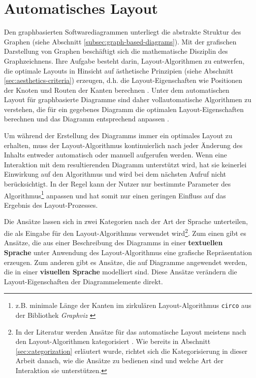\section{Automatisches Layout}
\label{sec:automatic-layout}

Den graphbasierten Softwarediagrammen unterliegt die abstrakte Struktur des Graphen (siehe Abschnitt \ref{subsec:graph-based-diagrams}). Mit der grafischen Darstellung von Graphen beschäftigt sich die mathematische Disziplin des Graphzeichnens. Ihre Aufgabe besteht darin, Layout-Algorithmen zu entwerfen, die optimale Layouts in Hinsicht auf ästhetische Prinzipien (siehe Abschnitt \ref{sec:aesthetics-criteria}) erzeugen, d.h. die Layout-Eigenschaften wie Positionen der Knoten und Routen der Kanten berechnen \cite{Eichelberger05Aesthetics, Arvo02Techniques, Siebenhaller03Automatisches, Maier12A-Pattern-based}. Unter dem automatischen Layout für graphbasierte Diagramme sind daher vollautomatische Algorithmen zu verstehen, die für ein gegebenes Diagramm die optimalen Layout-Eigenschaften berechnen und das Diagramm entsprechend anpassen \cite{Fuhrmann11On-the-Pragmatics}.

Um während der Erstellung des Diagramms immer ein optimales Layout zu erhalten, muss der Layout-Algorithmus kontinuierlich nach jeder Änderung des Inhalts entweder automatisch oder manuell aufgerufen werden. Wenn eine Interaktion mit dem resultierenden Diagramm unterstützt wird, hat sie keinerlei Einwirkung auf den Algorithmus und wird bei dem nächsten Aufruf nicht berücksichtigt. In der Regel kann der Nutzer nur bestimmte Parameter des Algorithmus\footnote{z.B. minimale Länge der Kanten im zirkulären Layout-Algorithmus \texttt{circo} aus der Bibliothek \textit{Graphviz} \cite{NorthGansner14Dot-Manual}} anpassen und hat somit nur einen geringen Einfluss auf das Ergebnis des Layout-Prozesses.

Die Ansätze lassen sich in zwei Kategorien nach der Art der Sprache unterteilen, die als Eingabe für den Layout-Algorithmus verwendet wird\footnote{In der Literatur werden Ansätze für das automatische Layout meistens nach den Layout-Algorithmen kategorisiert \cite{Fuhrmann11On-the-Pragmatics, Eichelberger05Aesthetics}. Wie bereits in Abschnitt \ref{sec:categorization} erläutert wurde, richtet sich die Kategorisierung in dieser Arbeit danach, wie die Ansätze zu bedienen sind und welche Art der Interaktion sie unterstützen.}. Zum einen gibt es Ansätze, die aus einer Beschreibung des Diagramms in einer \textbf{textuellen Sprache} unter Anwendung des Layout-Algorithmus eine grafische Repräsentation erzeugen. Zum anderen gibt es Ansätze, die auf Diagramme angewendet werden, die in einer \textbf{visuellen Sprache} modelliert sind. Diese Ansätze verändern die Layout-Eigenschaften der Diagrammelemente direkt.

